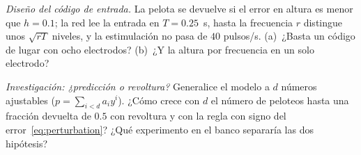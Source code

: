 \begin{exercise}[\lvlB]
\label{ex:22:6}
\emph{Diseño del código de entrada.} La pelota se devuelve si el error en altura es menor que $h=0.1$; la red lee la entrada en $T=0.25$~s, hasta la frecuencia $r$ distingue unos $\sqrt{rT}$ niveles, y la estimulación no pasa de $40$ pulsos/s. (a)~¿Basta un código de lugar con ocho electrodos? (b)~¿Y la altura por frecuencia en un solo electrodo?
\end{exercise}

\begin{exercise}[\lvlC]
\label{ex:22:7}
\emph{Investigación: ¿predicción o revoltura?} Generalice el modelo a $d$ números ajustables ($p=\sum_{i<d}a_iy^i$). ¿Cómo crece con $d$ el número de peloteos hasta una fracción devuelta de $0.5$ con revoltura y con la regla con signo del error~\eqref{eq:perturbation}? ¿Qué experimento en el banco separaría las dos hipótesis?
\end{exercise}
